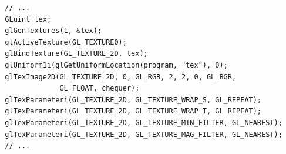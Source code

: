 \documentclass[calcdimensions,landscape,letterpaper]{powersem}
\newcommand{\thecurrentheading}{}
\newcommand{\heading}[1]{\renewcommand{\thecurrentheading}{#1}}
\begin{document}
\begin{slide}
    \heading{Texture Setup}
    \begin{center}
        \begin{minipage}[c]{\textwidth}
            \begin{verbatim}
  // ...
  GLuint tex;
  glGenTextures(1, &tex);
  glActiveTexture(GL_TEXTURE0);
  glBindTexture(GL_TEXTURE_2D, tex);
  glUniform1i(glGetUniformLocation(program, "tex"), 0);
  glTexImage2D(GL_TEXTURE_2D, 0, GL_RGB, 2, 2, 0, GL_BGR,
               GL_FLOAT, chequer);
  glTexParameteri(GL_TEXTURE_2D, GL_TEXTURE_WRAP_S, GL_REPEAT);
  glTexParameteri(GL_TEXTURE_2D, GL_TEXTURE_WRAP_T, GL_REPEAT);
  glTexParameteri(GL_TEXTURE_2D, GL_TEXTURE_MIN_FILTER, GL_NEAREST);
  glTexParameteri(GL_TEXTURE_2D, GL_TEXTURE_MAG_FILTER, GL_NEAREST);
  // ...
            \end{verbatim}
        \end{minipage}
    \end{center}
\end{slide}

\begin{slide}
    \heading{Textured Quad}
    \begin{center}
    \end{center}
\end{slide}

\end{document}
